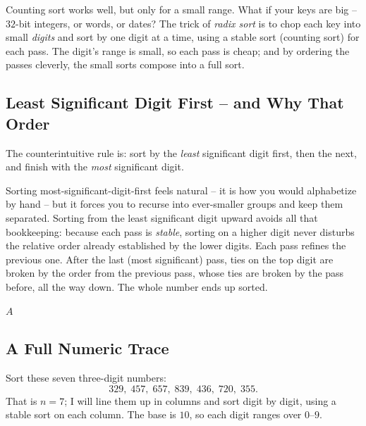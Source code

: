 Counting sort works well, but only for a small range. What if your keys are big
-- $32$-bit integers, or words, or dates? The trick of \emph{radix sort} is to
chop each key into small \emph{digits} and sort by one digit at a time, using a
stable sort (counting sort) for each pass. The digit's range is small, so each
pass is cheap; and by ordering the passes cleverly, the small sorts compose into
a full sort.

\subsection{Least Significant Digit First -- and Why That Order}

The counterintuitive rule is: sort by the \emph{least} significant digit first,
then the next, and finish with the \emph{most} significant digit.

\begin{intuitionbox}
Sorting most-significant-digit-first feels natural -- it is how you would
alphabetize by hand -- but it forces you to recurse into ever-smaller groups and
keep them separated. Sorting from the least significant digit upward avoids all
that bookkeeping: because each
pass is \emph{stable}, sorting on a higher digit never disturbs the relative
order already established by the lower digits. Each pass refines the previous
one. After the last (most significant) pass, ties on the top digit are broken by
the order from the previous pass, whose ties are broken by the pass before, all
the way down. The whole number ends up sorted.
\end{intuitionbox}

\begin{algorithm}[H]
\caption{\textsc{Radix-Sort}}
\Return $A$\;
\end{algorithm}

\subsection{A Full Numeric Trace}

Sort these seven three-digit numbers:
\[
329,\; 457,\; 657,\; 839,\; 436,\; 720,\; 355.
\]
That is $n = 7$; I will line them up in columns and sort digit by digit, using
a stable sort on each column. The base is $10$, so each digit ranges over
$0$--$9$.

